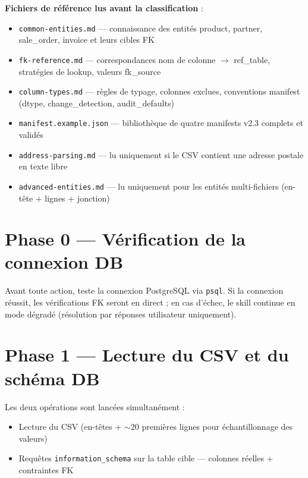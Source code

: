 \medskip
\textbf{Fichiers de référence lus avant la classification} :
\begin{itemize}
  \item \texttt{common-entities.md} — connaissance des entités product, partner, sale\_order, invoice et leurs cibles FK
  \item \texttt{fk-reference.md} — correspondances nom de colonne $\to$ ref\_table, stratégies de lookup, valeurs fk\_source
  \item \texttt{column-types.md} — règles de typage, colonnes exclues, conventions manifest (dtype, change\_detection, audit\_defaults)
  \item \texttt{manifest.example.json} — bibliothèque de quatre manifests v2.3 complets et validés
  \item \texttt{address-parsing.md} — lu uniquement si le CSV contient une adresse postale en texte libre
  \item \texttt{advanced-entities.md} — lu uniquement pour les entités multi-fichiers (en-tête + lignes + jonction)
\end{itemize}

\bigskip

\section*{Phase 0 — Vérification de la connexion DB}

Avant toute action, teste la connexion PostgreSQL via \texttt{psql}. Si la connexion
réussit, les vérifications FK seront en direct ; en cas d'échec, le skill continue en
mode dégradé (résolution par réponses utilisateur uniquement).

\section*{Phase 1 — Lecture du CSV et du schéma DB}

Les deux opérations sont lancées simultanément :

\begin{itemize}
  \item Lecture du CSV (en-têtes + $\sim$20 premières lignes pour échantillonnage des valeurs)
  \item Requêtes \texttt{information\_schema} sur la table cible — colonnes réelles + contraintes FK
\end{itemize}

